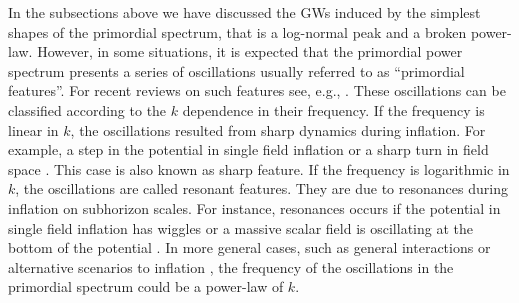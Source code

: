 \documentclass[a4paper,11pt]{article}
\numberwithin{equation}{section}
\begin{document}
In the subsections above we have discussed the GWs induced by the simplest shapes of the primordial spectrum, that is a log-normal peak and a broken power-law. However, in some situations, it is expected that the primordial power spectrum presents a series of oscillations usually referred to as ``primordial features''. For recent reviews on such features see, e.g., \cite{Chen:2010xka,Chluba:2015bqa,Slosar:2019gvt}. These oscillations can be classified according to the $k$ dependence in their frequency. If the frequency is linear in $k$, the oscillations resulted from sharp dynamics during inflation. For example, a step in the potential in single field inflation \cite{Starobinsky:1992ts,Adams:2001vc,Bean:2008na,Adshead:2011jq,Bartolo:2013exa,Palma:2014hra,Ballesteros:2018wlw,Kefala:2020xsx} or a sharp turn in field space \cite{Achucarro:2010da,Shiu:2011qw,Gao:2012uq,Palma:2020ejf,Fumagalli:2020adf,Fumagalli:2020nvq,Braglia:2020taf}. This case is also known as sharp feature. If the frequency is logarithmic in $k$, the oscillations are called resonant features. They are due to resonances during inflation on subhorizon scales. For instance, resonances occurs if the potential in single field inflation has wiggles or a massive scalar field is oscillating at the bottom of the potential \cite{Pahud:2008ae,Chen:2008wn,Silverstein:2008sg,Flauger:2009ab,Chen:2011zf,Chen:2014joa,Chen:2014cwa,Gao:2015aba,Fumagalli:2021cel}. In more general cases, such as general interactions \cite{Huang:2016quc,Domenech:2018bnf} or alternative scenarios to inflation \cite{Chen:2018cgg}, the frequency of the oscillations in the primordial spectrum could be a power-law of $k$.
\end{document}
